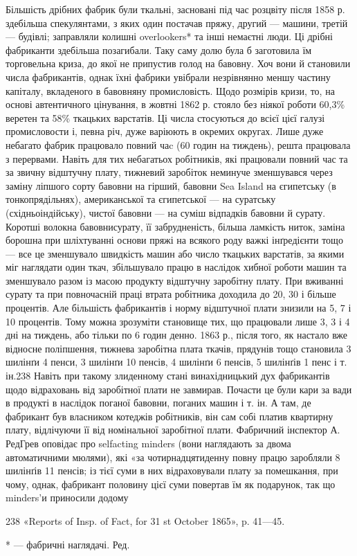 Більшість дрібних фабрик були ткальні, засновані під час розцвіту
після 1858 р. здебільша спекулянтами, з яких один постачав
пряжу, другий — машини, третій — будівлі; заправляли колишні
overlookers* та інші немаєтні люди. Ці дрібні фабриканти здебільша
позагибали. Таку саму долю була б заготовила їм торговельна
криза, до якої не припустив голод на бавовну. Хоч вони
й становили  числа фабрикантів, однак їхні фабрики увібрали
незрівнянно меншу частину капіталу, вкладеного в бавовняну промисловість.
Щодо розмірів кризи, то, на основі автентичного
цінування, в жовтні 1862 р. стояло без ніякої роботи 60,3\%
веретен та 58\% ткацьких варстатів. Ці числа стосуються до всієї
цієї галузі промисловости і, певна річ, дуже варіюють в окремих
округах. Лише дуже небагато фабрик працювало повний чаc (60 годин на тиждень), решта працювала з
перервами. Навіть
для тих небагатьох робітників, які працювали повний час
та за звичну відштучну плату, тижневий заробіток неминуче зменшувався
через заміну ліпшого сорту бавовни на гірший, бавовни
Sea Island на єгипетську (в тонкопрядільнях), американської та
єгипетської — на суратську (східньоіндійську), чистої бавовни —
на суміш відпадків бавовни й сурату. Коротші волокна бавовнисурату,
її забрудненість, більша ламкість ниток, заміна борошна
при шліхтуванні основи пряжі на всякого роду важкі інґредієнти
тощо — все це зменшувало швидкість машин або число ткацьких
варстатів, за якими міг наглядати один ткач, збільшувало працю
в наслідок хибної роботи машин та зменшувало разом із масою
продукту відштучну заробітну плату. При вживанні сурату та
при повночасній праці втрата робітника доходила до 20, 30 і
більше процентів. Але більшість фабрикантів і норму відштучної
плати знизили на 5, 7 і 10 процентів. Тому можна зрозуміти
становище тих, що працювали лише 3, 3 і 4 дні на тиждень,
або тільки по 6 годин денно. 1863 р., після того, як настало вже
відносне поліпшення, тижнева заробітна плата ткачів, прядунів
тощо становила 3 шилінґи 4 пенси, 3 шилінґи 10 пенсів, 4 шилінґи
6 пенсів, 5 шилінґів 1 пенс і т. ін.238 Навіть при такому злиденному
стані винахідницький дух фабрикантів щодо відраховань
від заробітної плати не завмирав. Почасти це були кари за вади
в продукті в наслідок поганої бавовни, поганих машин і т. ін.
А там, де фабрикант був власником котеджів робітників, він сам
собі платив квартирну плату, відлічуючи її від номінальної
заробітної плати. Фабричний інспектор А. РедГрев оповідає
про selfacting minders (вони наглядають за двома автоматичними
мюлями), які «за чотирнадцятиденну повну працю заробляли
8 шилінґів 11 пенсів; із тієї суми в них відраховували плату за
помешкання, при чому, однак, фабрикант половину цієї суми
повертав їм як подарунок, так що minders’и приносили додому

238 «Reports of Insp. of Fact, for 31 st October 1865», p. 41—45.

* — фабричні наглядачі. Ред.
